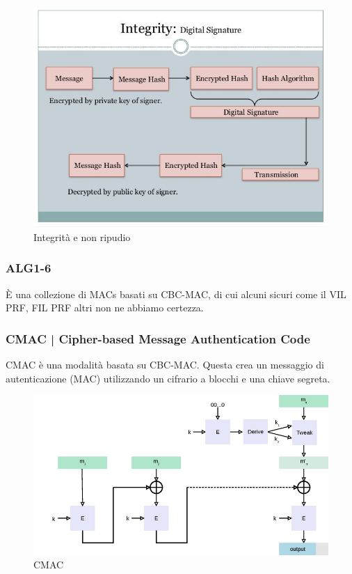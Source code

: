 \begin{figure}[H]
	\centering
	\includegraphics[width=.9\textwidth, height=.9\textheight, keepaspectratio]{./images/aes_modes/encryption-integrity-and-nonrepudiation.png}
	\caption{Integrità e non ripudio}
	\label{fig:encryption-integrity-and-nonrepudiation}
\end{figure}

\subsubsection{ALG1-6}

\textsf{\small È una collezione di MACs basati su CBC-MAC, di cui alcuni sicuri come il VIL PRF, FIL PRF altri non ne abbiamo certezza.}

\subsubsection{CMAC | Cipher-based Message Authentication Code}

\textsf{\small CMAC è una modalità basata su CBC-MAC. Questa crea un messaggio di autenticazione (MAC) utilizzando un cifrario a blocchi e una chiave segreta. }

\begin{figure}[H]
	\centering
	\includegraphics[width=.9\textwidth, height=.9\textheight, keepaspectratio]{./images/aes_modes/CMAC_-_Cipher-based_Message_Authentication_Code}
	\caption{CMAC}
	\label{fig:cmac}
\end{figure}


